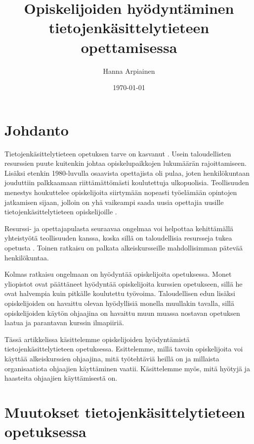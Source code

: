 \documentclass[finnish]{tktltiki2}
\title{﻿Opiskelijoiden hyödyntäminen tietojenkäsittelytieteen opettamisessa}
\author{Hanna Arpiainen}
\date{\today}
\theoremstyle{definition}
\theoremstyle{remark}
\begin{document}
\frontmatter
\maketitle
\makeabstract
\thispagestyle{empty}
\tableofcontents
\thispagestyle{empty}
\newpage

\mainmatter

\setcounter{page}{1}



\section{Johdanto}
Tietojenkäsittelytieteen opetuksen tarve on kasvanut \cite{Roberts11}. Usein taloudellisten resurssien puute kuitenkin johtaa opiskelupaikkojen lukumäärän rajoittamiseen. Lisäksi etenkin 1980-luvulla osaavista opettajista oli pulaa, joten henkilökuntaan jouduttiin palkkaamaan riittämättömästi koulutettuja ulkopuolisia. Teollisuuden menestys houkuttelee opiskelijoita siirtymään nopeasti työelämään opintojen jatkamisen sijaan, jolloin on yhä vaikeampi saada uusia opettajia uusille tietojenkäsittelytieteen opiskelijoille \cite{Roberts99}. \par

Resurssi- ja opettajapulasta seuraavaa ongelmaa voi helpottaa kehittämällä yhteistyötä teollisuuden kanssa, koska sillä on taloudellisia resursseja tukea opetusta \cite{Roberts11}. Toinen ratkaisu on palkata alkeiskursseille mahdollisimman pätevää henkilökuntaa. \par

Kolmas ratkaisu ongelmaan on hyödyntää opiskelijoita opetuksessa. Monet yliopistot ovat päättäneet hyödyntää opiskelijoita kurssien opetukseen, sillä he ovat halvempia kuin pitkälle koulutettu työvoima. Taloudellisen edun lisäksi opiskelijoiden on havaittu olevan hyödyllisiä monella muullakin tavalla, sillä opiskelijoiden käytön ohjaajina on havaittu muun muassa nostavan opetuksen laatua ja parantavan kurssin ilmapiiriä. \par

Tässä artikkelissa käsittelemme opiskelijoiden hyödyntämistä tie\-to\-jen\-kä\-sit\-te\-ly\-tie\-teen opetuksessa. Esittelemme, millä tavoin opiskelijoita voi käyttää alkeiskurssien ohjaajina, mitä työtehtäviä heillä on ja millaista organisaatiota ohjaajien käyttäminen vaatii. Käsittelemme myös, mitä hyötyjä ja haasteita ohjaajien käyttämisestä on. \par


\section{Muutokset tietojenkäsittelytieteen opetuksessa}
\end{document}
